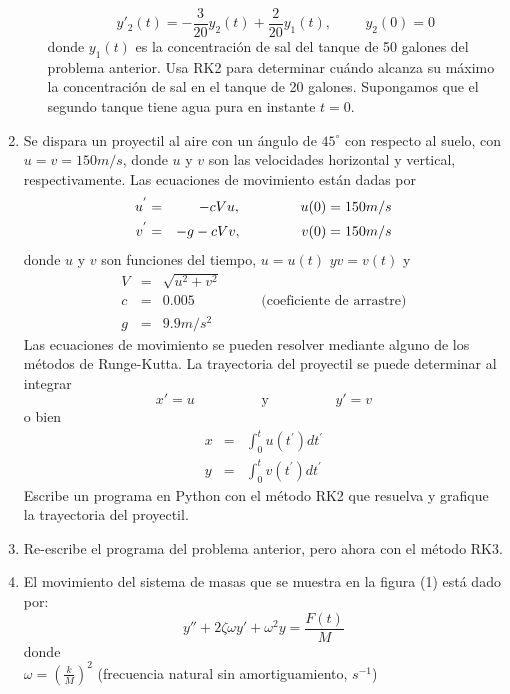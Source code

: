\documentclass[12pt]{article}
\begin{document}
\begin{enumerate}
\begin{enumerate}
		\[ y'_{2}(t) = - \frac{3}{20} y_{2}(t) + \frac{2}{20} y_{1}(t), \hspace{1cm} y_{2}(0)=0 \]
		donde $y_{1}(t)$ es la concentraci\'{o}n de sal del tanque de 50 galones del problema anterior. Usa RK2 para determinar cu\'{a}ndo alcanza su m\'{a}ximo la concentraci\'{o}n de sal en el tanque de 20 galones. Supongamos que el segundo tanque tiene agua pura en instante $t=0$.
	\end{enumerate}
\item Se dispara un proyectil al aire con un \'{a}ngulo de $45^{\circ}$ con respecto al suelo, con $u=v=150 m/s$, donde $u$ y $v$ son las velocidades horizontal y vertical, respectivamente. Las ecuaciones de movimiento est\'{a}n dadas por
\begin{eqnarray*}
	u^{'} & = & -c Vu, \hspace{1.5cm} u(0)=150 m/s \\
	v^{'} & = & -g - cVv, \hspace{1.5cm} v(0)=150 m/s
\end{eqnarray*}
donde $u$ y $v$ son funciones del tiempo, $u=u(t)$ $y v=v(t)$ y
\begin{eqnarray*}
	V & = & \sqrt{u^{2} + v^{2}} \\
	c & = & 0.005 \hspace{2cm} \mbox{(coeficiente de arrastre)} \\
	g & = & 9.9 m/s^{2}
\end{eqnarray*}
Las ecuaciones de movimiento se pueden resolver mediante alguno de los m\'{e}todos de Runge-Kutta. La trayectoria del proyectil se puede determinar al integrar
\[ x' = u \hspace{2cm} \mbox{y} \hspace{2cm} y' = v \]
o bien
\begin{eqnarray*}
	x & = & \int^{t}_{0} u(t^{'}) dt^{'} \\
	y & = & \int^{t}_{0} v(t^{'}) dt^{'}
\end{eqnarray*}
Escribe un programa en Python con el m\'{e}todo RK2 que resuelva y grafique la trayectoria del proyectil.
\item Re-escribe el programa del problema anterior, pero ahora con el m\'{e}todo RK3.
\item El movimiento del sistema de masas que se muestra en la figura (1) est\'{a} dado por:
\[ y'' + 2 \zeta \omega y' + \omega^{2}y = \frac{F(t)}{M}\]
donde \\ 
$\omega = \left( \frac{k}{M} \right)^{2}$ (frecuencia natural sin amortiguamiento, $s^{-1}$) \\

\end{enumerate}
\end{document}

